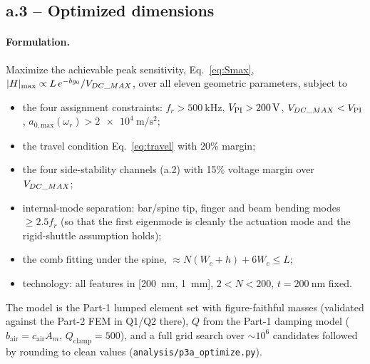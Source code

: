 \subsection*{a.3 -- Optimized dimensions}

\paragraph{Formulation.} Maximize the achievable peak sensitivity,
Eq.~\ref{eq:Smax}, $|H|_{\mathrm{max}}\propto L\,e^{-bg_{0}}/V_{DC\_MAX}$,
over all eleven geometric parameters, subject to
\begin{itemize}
  \item the four assignment constraints: $f_{r}>\SI{500}{\kilo\hertz}$,
        $V_{\mathrm{PI}}>\SI{200}{\volt}$, $V_{DC\_MAX}<V_{\mathrm{PI}}$,
        $a_{0,\mathrm{max}}(\omega_{r})>\SI{2e4}{\meter\per\second\squared}$;
  \item the travel condition Eq.~\ref{eq:travel} with 20\% margin;
  \item the four side-stability channels (a.2) with 15\% voltage margin over
        $V_{DC\_MAX}$;
  \item internal-mode separation: bar/spine tip, finger and beam bending
        modes $\ge 2.5f_{r}$ (so that the first eigenmode is cleanly the
        actuation mode and the rigid-shuttle assumption holds);
  \item the comb fitting under the spine, $\approx N(W_{c}+h)+6W_{c}\le L$;
  \item technology: all features in
        [\SI{200}{\nano\meter}, \SI{1}{\milli\meter}], $2<N<200$,
        $t=\SI{200}{\nano\meter}$ fixed.
\end{itemize}
The model is the Part-1 lumped element set with figure-faithful masses
(validated against the Part-2 FEM in Q1/Q2 there), $Q$ from the Part-1
damping model ($b_{\mathrm{air}}=c_{\mathrm{air}}A_{m}$,
$Q_{\mathrm{clamp}}=500$), and a full grid search over $\sim10^{6}$
candidates followed by rounding to clean values
(\texttt{analysis/p3a\_optimize.py}).

